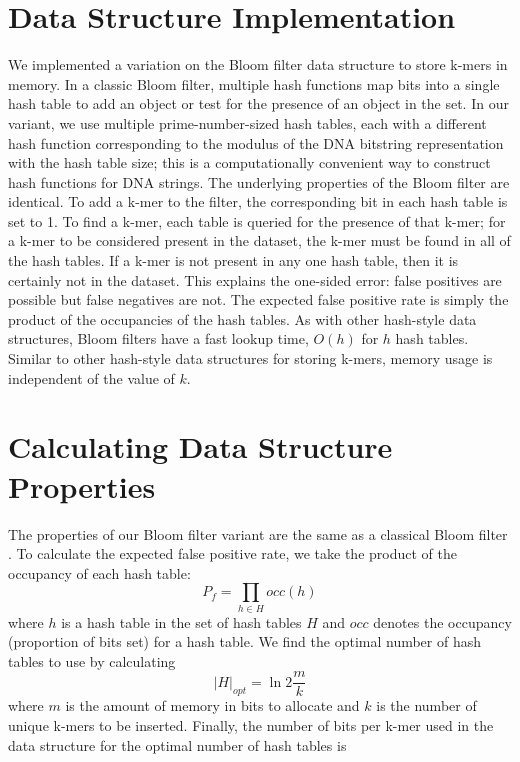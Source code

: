 \documentclass{pnastwo}
\begin{document}
\begin{article}
\begin{materials}
\section{Data Structure Implementation}
We implemented a variation on the Bloom filter data structure to store
k-mers in memory. In a classic Bloom filter, multiple hash functions
map bits into a single hash table to add an object or test for the presence
of an object in the set. In our variant, we use multiple
prime-number-sized hash tables, each with a different hash
function corresponding to the modulus of the DNA bitstring
representation with the hash table size; this is a computationally convenient way to construct hash functions for DNA strings.  The underlying properties of
the Bloom filter are identical.  To add a k-mer to the
filter, the corresponding bit in each hash table is set to 1.  To find
a k-mer, each table is queried for the presence of
that k-mer; for a k-mer to be considered present in the dataset, the
k-mer must be found in all of the hash tables.  If a k-mer is not
present in any one hash table, then it is certainly not in the
dataset. This explains the one-sided error: false positives are
possible but false negatives are not. The expected false positive rate
is simply the product of the occupancies of the hash tables.  As with
other hash-style data structures, Bloom filters have a fast lookup
time, $O(h)$ for $h$ hash tables.  Similar to other hash-style data
structures for storing k-mers, memory usage is independent of the
value of $k$.

\section{Calculating Data Structure Properties}
The properties of our Bloom filter variant are the
same as a classical Bloom filter \cite{bloomsurvey}.
To calculate the expected false positive 
rate, we
take the product of the occupancy of each hash table:
\begin{displaymath}
P_f = \prod_{h \in H} occ(h)
\end{displaymath}
where $h$ is a hash table in the set of hash tables $H$ and $occ$ denotes
the occupancy (proportion of bits set) for a hash table.
We find the optimal number of hash tables
to use by calculating
\begin{displaymath}
\vert H \vert_{opt} = \ln 2 \frac{m}{k}
\end{displaymath}
where $m$ is the amount of memory in bits to allocate and $k$
is the number of unique k-mers to be inserted. Finally,
the number of bits per
k-mer used in the data structure for the optimal number of hash 
tables is


\end{materials}
\end{article}
\end{document}

